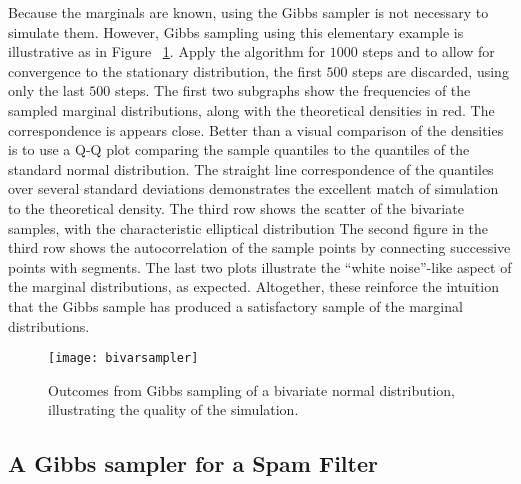 \documentclass[12pt]{article}
\begin{document}
Because the marginals are known, using the Gibbs sampler is not
necessary to simulate them.  However, Gibbs sampling using this
elementary example is illustrative as in Figure~%
\ref{fig:gibbsampler:bivarsampler}.  Apply the algorithm for \( 1000 \)
steps and to allow for convergence to the stationary distribution, the
first \( 500 \) steps are discarded, using only the last \( 500 \)
steps.  The first two subgraphs show the frequencies of the sampled
marginal distributions, along with the theoretical densities in red.
The correspondence is appears close.  Better than a visual comparison of
the densities is to use a Q-Q plot comparing the sample quantiles to the
quantiles of the standard normal distribution.  The straight line
correspondence of the quantiles over several standard deviations
demonstrates the excellent match of simulation to the theoretical
density.  The third row shows the scatter of the bivariate samples, with
the characteristic elliptical distribution The second figure in the
third row shows the autocorrelation of the sample points by connecting
successive points with segments.  The last two plots illustrate the
``white noise''-like aspect of the marginal distributions, as expected.
Altogether, these reinforce the intuition that the Gibbs sample has
produced a satisfactory sample of the marginal distributions.

\begin{figure}
    \centering
    \texttt{[image: bivarsampler]}
    \caption{Outcomes from Gibbs sampling of a bivariate normal
    distribution, illustrating the quality of the simulation.}%
    \label{fig:gibbsampler:bivarsampler}
\end{figure}

\subsection*{A Gibbs sampler for a Spam Filter}
\end{document}
